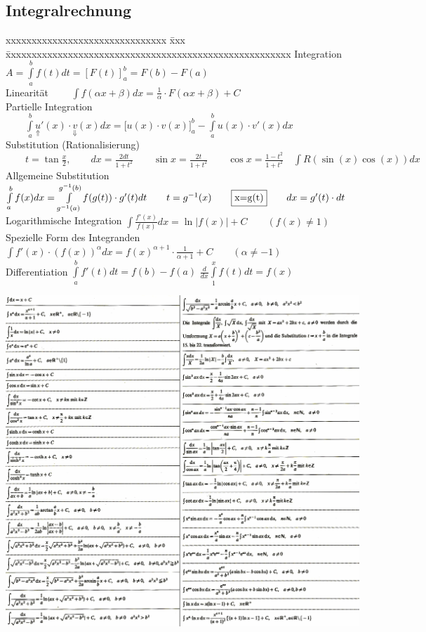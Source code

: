 	\subsection{Integralrechnung}	
	\begin{tabbing}
	     xxxxxxxxxxxxxxxxxxxxxxxxxxxxxxx \= xxx \= xxxxxxxxxxxxxxxxxxxxxxxxxxxxxxxxxxxxxxxxxxxxxxxxxxxxxxx\kill  
	     Integration\>\>$A=\int\limits_{a}^{b}{f(t)dt}=\left[F(t)\right]_a^b=F(b)-F(a)$\\[0.2cm]
	     Linearität\>		  
	   $\qquad\int{f(\alpha x+\beta )dx=\frac{1}{\alpha}\cdot F(\alpha x+
				\beta)+C}$\\[0.2cm]
		   Partielle Integration\>
	   $\qquad\int\limits_a^b{\underset{\Uparrow}{u}'(x)\cdot \underset{\Downarrow}{v}(x)dx}=\biggl[ u(x)\cdot v(x) \biggr]_a^b
	   -\int\limits_a^b{u(x)\cdot v'(x)dx}$\\[0.2cm]
	   Substitution (Rationalisierung)\>
	   $\qquad t=\tan\frac{x}{2}, \qquad dx=\frac{2dt}{1+t^2} \qquad 
	   \sin  x=\frac{2t}{1+t^2} \qquad \cos x=\frac{1-t^2}{1+t^2}
				\quad\int{R(\sin(x)\cos(x))dx}$\\ 
	   Allgemeine Substitution \> \>
				$\int\limits_{a}^{b}{f(x)dx}=\int\limits_{g^{-1}(a)}^{g^{-1}(b)}{f(g(t))\cdot
				g'(t)dt}\qquad t=g^{-1}(x)\qquad  \fbox{x=g(t)}\qquad dx=g'(t)\cdot dt$\\
	   Logarithmische Integration \>\>
	    $ \int{\frac{f'(x)}{f(x)}dx}=\ln|f(x)|+C	\qquad{(f(x)\neq 1)}$\\[0.2cm]
	  Spezielle Form des Integranden \>\>
		 		$\int{f'(x)\cdot (f(x))^{\alpha} dx}= f(x)^{\alpha +1}\cdot
		 		\frac{1}{\alpha+1}+C \qquad{(\alpha \neq -1)}$\\ 
	   Differentiation\>\>
		 		$\int \limits ^{b} _{a} {f'(t)dt}=f(b)-f(a)$\qquad
				$\frac{d}{dx} \int \limits ^{x} _{1} {f(t)dt}=f(x)$
	\end{tabbing}
	\includegraphics[width=19cm]{Content/Rechenregeln/integrale.png} 
	
